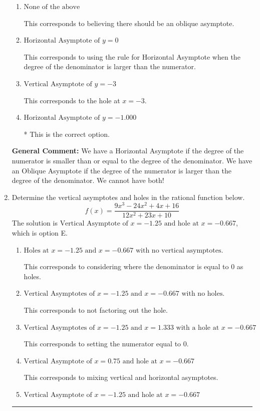 \documentclass{extbook}[14pt]
\newcommand{\litem}[1]{\item #1

\rule{\textwidth}{0.4pt}}
\begin{document}
\begin{enumerate}
{\begin{enumerate}[label=\Alph*.]
This corresponds to the hole at $x = -0.667$.
\item \( \text{None of the above} \)

This corresponds to believing there should be an oblique asymptote.
\item \( \text{Horizontal Asymptote of } y = 0  \)

This corresponds to using the rule for Horizontal Asymptote when the degree of the denominator is larger than the numerator.
\item \( \text{Vertical Asymptote of } y = -3  \)

This corresponds to the hole at $x = -3$.
\item \( \text{Horizontal Asymptote of } y = -1.000  \)

* This is the correct option.
\end{enumerate}

\textbf{General Comment:} We have a Horizontal Asymptote if the degree of the numerator is smaller than or equal to the degree of the denominator. We have an Oblique Asymptote if the degree of the numerator is larger than the degree of the denominator. We cannot have both!
}
\litem{
Determine the vertical asymptotes and holes in the rational function below.
\[ f(x) = \frac{9x^{3} -24 x^{2} +4 x + 16}{12x^{2} +23 x + 10} \]The solution is \( \text{Vertical Asymptote of } x = -1.25 \text{ and hole at } x = -0.667 \), which is option E.\begin{enumerate}[label=\Alph*.]
\item \( \text{Holes at } x = -1.25 \text{ and } x = -0.667 \text{ with no vertical asymptotes.} \)

This corresponds to considering where the denominator is equal to 0 as holes.
\item \( \text{Vertical Asymptotes of } x = -1.25 \text{ and } x = -0.667 \text{ with no holes.} \)

This corresponds to not factoring out the hole.
\item \( \text{Vertical Asymptotes of } x = -1.25 \text{ and } x = 1.333 \text{ with a hole at } x = -0.667 \)

This corresponds to setting the numerator equal to 0.
\item \( \text{Vertical Asymptote of } x = 0.75 \text{ and hole at } x = -0.667 \)

This corresponds to mixing vertical and horizontal asymptotes.
\item \( \text{Vertical Asymptote of } x = -1.25 \text{ and hole at } x = -0.667 \)


\end{enumerate}}
\end{enumerate}
\end{document}
